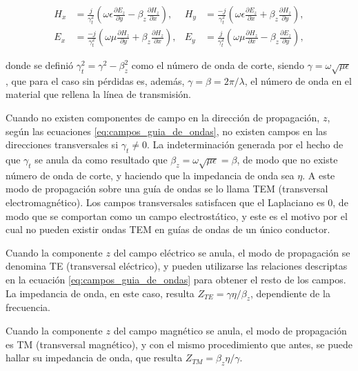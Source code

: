 \begin{equation}
	\begin{aligned}
		H_x &= \frac{j}{\gamma_t^2} \left(\omega \epsilon \frac{\partial E_z}{\partial y} - \beta_z \frac{\partial H_z}{\partial x} \right), & H_y &= \frac{-j}{\gamma_t^2} \left(\omega \epsilon \frac{\partial E_z}{\partial x} + \beta_z \frac{\partial H_z}{\partial y} \right),\\
		E_x &= \frac{-j}{\gamma_t^2} \left(\omega \mu \frac{\partial H_z}{\partial y} + \beta_z \frac{\partial H_z}{\partial x} \right), & E_y &= \frac{j}{\gamma_t^2} \left(\omega \mu \frac{\partial H_z}{\partial x} - \beta_z \frac{\partial E_z}{\partial y} \right),
	\end{aligned}
	\label{eq:campos_guia_de_ondas}
\end{equation}

donde se definió $\gamma_t^2 = \gamma^2 - \beta_z^2$ como el número de onda de corte, siendo $\gamma = \omega \sqrt{\mu \epsilon}$, que para el caso sin pérdidas es, además, $\gamma = \beta = 2\pi/\lambda$, el número de onda  en el material que rellena la línea de transmisión.

Cuando no existen componentes de campo en la dirección de propagación, $z$, según las ecuaciones \ref{eq:campos_guia_de_ondas}, no existen campos en las direcciones transversales si $\gamma_t \neq 0$. La indeterminación generada por el hecho de que $\gamma_t$ se anula da como resultado que $\beta_z = \omega \sqrt{\mu \epsilon} = \beta$, de modo que no existe número de onda de corte, y haciendo que la impedancia de onda sea $\eta$.  A este modo de propagación sobre una guía de ondas se lo llama TEM (transversal electromagnético). Los campos transversales satisfacen que el Laplaciano es 0, de modo que se comportan como un campo electrostático, y este es el motivo por el cual no pueden existir ondas TEM en guías de ondas de un único conductor.

Cuando la componente $z$ del campo eléctrico se anula, el modo de propagación se denomina TE (transversal eléctrico), y pueden utilizarse las relaciones descriptas en la ecuación \ref{eq:campos_guia_de_ondas} para obtener el resto de los campos. La impedancia de onda, en este caso, resulta $Z_{TE} = \gamma\eta/\beta_z$, dependiente de la frecuencia.

Cuando la componente $z$ del campo magnético se anula, el modo de propagación es TM (transversal magnético), y con el mismo procedimiento que antes, se puede hallar su impedancia de onda, que resulta $Z_{TM} = \beta_z \eta / \gamma$.

